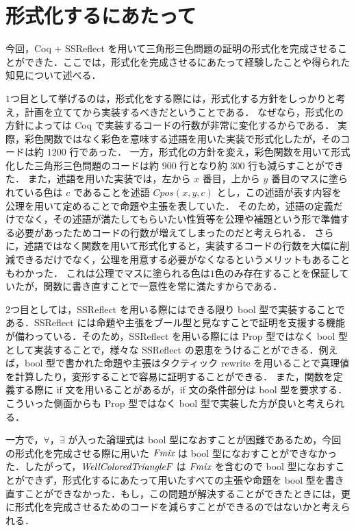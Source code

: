 \section{形式化するにあたって}
今回，Coq + SSReflect を用いて三角形三色問題の証明の形式化を完成させることができた．ここでは，形式化を完成させるにあたって経験したことや得られた知見について述べる．

$1$つ目として挙げるのは，形式化をする際には，形式化する方針をしっかりと考え，計画を立ててから実装するべきだということである．
なぜなら，形式化の方針によっては Coq で実装するコードの行数が非常に変化するからである．
実際，彩色関数ではなく彩色を意味する述語を用いた実装で形式化したが，そのコードは約 $1200$ 行であった．
一方，形式化の方針を変え，彩色関数を用いて形式化した三角形三色問題のコードは約 $900$ 行となり約 $300$ 行も減らすことができた．
また，述語を用いた実装では，左から $x$ 番目，上から $y$ 番目のマスに塗られている色は $c$ であることを述語 $Cpos(x,y,c)$ とし，この述語が表す内容を公理を用いて定めることで命題や主張を表していた．
そのため，述語の定義だけでなく，その述語が満たしてもらいたい性質等を公理や補題という形で準備する必要があったためコードの行数が増えてしまったのだと考えられる．
さらに，述語ではなく関数を用いて形式化すると，実装するコードの行数を大幅に削減できるだけでなく，公理を用意する必要がなくなるというメリットもあることもわかった．
これは公理でマスに塗られる色は$1$色のみ存在することを保証していたが，関数に書き直すことで一意性を常に満たすからである．

$2$つ目としては，SSReflect を用いる際にはできる限り bool 型で実装することである．SSReflect には命題や主張をブール型と見なすことで証明を支援する機能が備わっている．そのため，SSReflect を用いる際には Prop 型ではなく bool 型として実装することで，様々な SSReflect の恩恵をうけることができる．例えば，bool 型で書かれた命題や主張はタクティック rewrite を用いることで真理値を計算したり，変形することで容易に証明することができる．
また，関数を定義する際に if 文を用いることがあるが，if 文の条件部分は bool 型を要求する．こういった側面からも Prop 型ではなく bool 型で実装した方が良いと考えられる．

一方で，$\forall$，$\exists$ が入った論理式は bool 型になおすことが困難であるため，今回の形式化を完成させる際に用いた $\textit{Fmix}$ は bool 型になおすことができなかった．したがって，$\textit{WellColoredTriangleF}$ は $\textit{Fmix}$ を含むので bool 型になおすことができず，形式化するにあたって用いたすべての主張や命題を bool 型を書き直すことができなかった．もし，この問題が解決することができたときには，更に形式化を完成させるためのコードを減らすことができるのではないかと考えられる．



